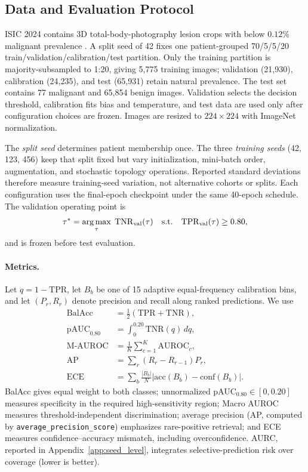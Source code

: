 \documentclass[letterpaper]{article}
\DeclareMathOperator*{\argmax}{arg\,max}
\begin{document}
\subsection{Data and Evaluation Protocol}
ISIC 2024 contains 3D total-body-photography lesion crops with below $0.12\%$ malignant prevalence \cite{isic2024slice3d}. A split seed of 42 fixes one patient-grouped 70/5/5/20 train/validation/calibration/test partition. Only the training partition is majority-subsampled to 1:20, giving 5,775 training images; validation (21,930), calibration (24,235), and test (65,931) retain natural prevalence. The test set contains 77 malignant and 65,854 benign images. Validation selects the decision threshold, calibration fits bias and temperature, and test data are used only after configuration choices are frozen. Images are resized to $224\times224$ with ImageNet normalization.

The \emph{split seed} determines patient membership once. The three \emph{training seeds} (42, 123, 456) keep that split fixed but vary initialization, mini-batch order, augmentation, and stochastic topology operations. Reported standard deviations therefore measure training-seed variation, not alternative cohorts or splits. Each configuration uses the final-epoch checkpoint under the same 40-epoch schedule. The validation operating point is
\begin{equation}\label{eq:threshold}
\tau^*=\argmax_{\tau}\;\mathrm{TNR}_{\rm val}(\tau)
\quad\mathrm{s.t.}\quad \mathrm{TPR}_{\rm val}(\tau)\ge0.80,
\end{equation}
and is frozen before test evaluation.

\paragraph{Metrics.} Let $q=1-\mathrm{TPR}$, let $B_b$ be one of 15 adaptive equal-frequency calibration bins, and let $(P_r,R_r)$ denote precision and recall along ranked predictions. We use
\begin{equation}\label{eq:metrics}
\begin{aligned}
\mathrm{BalAcc}&=\tfrac12(\mathrm{TPR}+\mathrm{TNR}),\\
\mathrm{pAUC}_{0.80}&=\int_{0}^{0.20}\mathrm{TNR}(q)\,dq,\\
\mathrm{M\!\text{-}AUROC}&=\tfrac1K\sum_{c=1}^{K}\mathrm{AUROC}_c,\\
\mathrm{AP}&=\sum_r(R_r-R_{r-1})P_r,\\
\mathrm{ECE}&=\sum_b\tfrac{|B_b|}{N}
\left|\mathrm{acc}(B_b)-\mathrm{conf}(B_b)\right|.
\end{aligned}
\end{equation}
BalAcc gives equal weight to both classes; unnormalized pAUC$_{0.80}\in[0,0.20]$ measures specificity in the required high-sensitivity region; Macro AUROC measures threshold-independent discrimination; average precision (AP, computed by \texttt{average\_precision\_score}) emphasizes rare-positive retrieval; and ECE measures confidence--accuracy mismatch, including overconfidence. AURC, reported in Appendix~\ref{app:seed_level}, integrates selective-prediction risk over coverage (lower is better).
\end{document}
